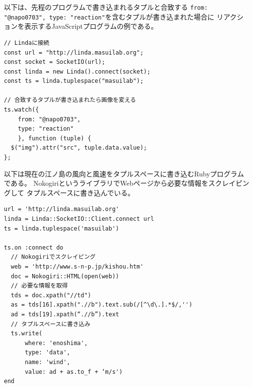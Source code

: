 以下は、先程のプログラムで書き込まれるタプルと合致する
\texttt{{from: "@napo0703", type: "reaction"}}を含むタプルが書き込まれた場合に
リアクションを表示するJavaScriptプログラムの例である。

\vspace{2mm}
\begin{lstlisting}
// Lindaに接続
const url = "http://linda.masuilab.org";
const socket = SocketIO(url);
const linda = new Linda().connect(socket);
const ts = linda.tuplespace("masuilab");

// 合致するタプルが書き込まれたら画像を変える
ts.watch({
    from: "@napo0703",
    type: "reaction"
    }, function (tuple) {
  $("img").attr("src", tuple.data.value);
};
\end{lstlisting}

以下は現在の江ノ島の風向と風速をタプルスペースに書き込むRubyプログラムである。
NokogiriというライブラリでWebページから必要な情報をスクレイピングして
タプルスペースに書き込んでいる。

\vspace{2mm}
\begin{lstlisting}
url = 'http://linda.masuilab.org'
linda = Linda::SocketIO::Client.connect url
ts = linda.tuplespace('masuilab')

ts.on :connect do
  // Nokogiriでスクレイピング
  web = 'http://www.s-n-p.jp/kishou.htm'
  doc = Nokogiri::HTML(open(web))
  // 必要な情報を取得
  tds = doc.xpath("//td")
  as = tds[16].xpath(".//b").text.sub(/[^\d\.].*$/,'')
  ad = tds[19].xpath(“.//b”).text
  // タプルスペースに書き込み
  ts.write(
      where: 'enoshima',
      type: 'data',
      name: 'wind',
      value: ad + as.to_f + ‘m/s')
end
\end{lstlisting}